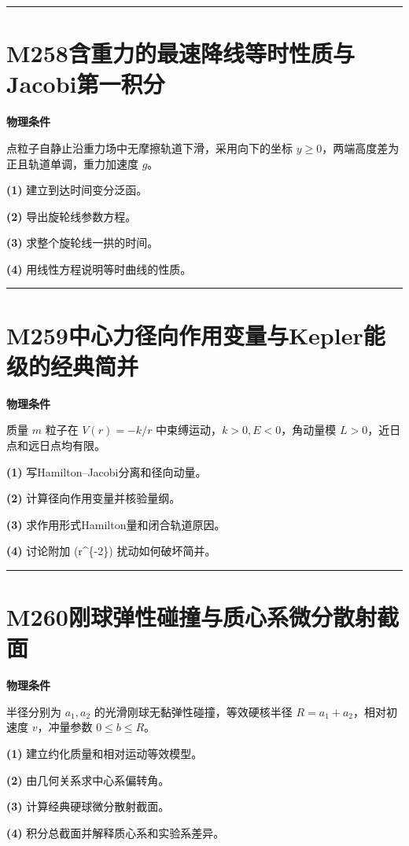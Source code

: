 \documentclass[UTF8,a4paper,11pt,oneside,openany]{ctexbook}
\begin{document}
\par\bigskip\hrule\bigskip
\section*{M258\quad 含重力的最速降线等时性质与Jacobi第一积分}
\textbf{物理条件}\par 点粒子自静止沿重力场中无摩擦轨道下滑，采用向下的坐标 \(y\ge0\)，两端高度差为正且轨道单调，重力加速度 \(g\)。
\par\noindent\textbf{(1)} 建立到达时间变分泛函。
\par\noindent\textbf{(2)} 导出旋轮线参数方程。
\par\noindent\textbf{(3)} 求整个旋轮线一拱的时间。
\par\noindent\textbf{(4)} 用线性方程说明等时曲线的性质。

\par\bigskip\hrule\bigskip
\section*{M259\quad 中心力径向作用变量与Kepler能级的经典简并}
\textbf{物理条件}\par 质量 \(m\) 粒子在 \(V(r)=-k/r\) 中束缚运动，\(k>0,E<0\)，角动量模 \(L>0\)，近日点和远日点均有限。
\par\noindent\textbf{(1)} 写Hamilton–Jacobi分离和径向动量。
\par\noindent\textbf{(2)} 计算径向作用变量并核验量纲。
\par\noindent\textbf{(3)} 求作用形式Hamilton量和闭合轨道原因。
\par\noindent\textbf{(4)} 讨论附加 (r\textasciicircum{}\{-2\}) 扰动如何破坏简并。

\par\bigskip\hrule\bigskip
\section*{M260\quad 刚球弹性碰撞与质心系微分散射截面}
\textbf{物理条件}\par 半径分别为 \(a_1,a_2\) 的光滑刚球无黏弹性碰撞，等效硬核半径 \(R=a_1+a_2\)，相对初速度 \(v\)，冲量参数 \(0\le b\le R\)。
\par\noindent\textbf{(1)} 建立约化质量和相对运动等效模型。
\par\noindent\textbf{(2)} 由几何关系求中心系偏转角。
\par\noindent\textbf{(3)} 计算经典硬球微分散射截面。
\par\noindent\textbf{(4)} 积分总截面并解释质心系和实验系差异。
\end{document}
